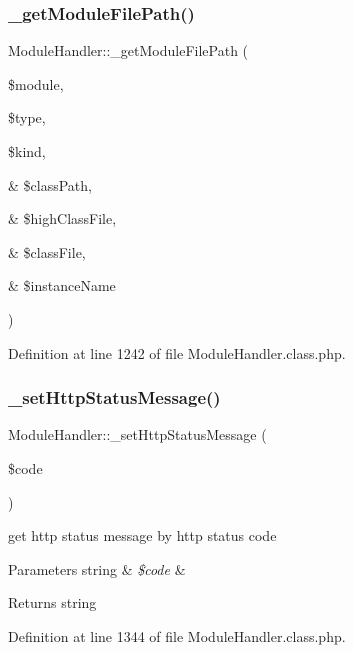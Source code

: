 \subsubsection{\texorpdfstring{\+\_\+get\+Module\+File\+Path()}{\_getModuleFilePath()}}
{\footnotesize\ttfamily Module\+Handler\+::\+\_\+get\+Module\+File\+Path (\begin{DoxyParamCaption}\item[{}]{\$module,  }\item[{}]{\$type,  }\item[{}]{\$kind,  }\item[{\&}]{\$class\+Path,  }\item[{\&}]{\$high\+Class\+File,  }\item[{\&}]{\$class\+File,  }\item[{\&}]{\$instance\+Name }\end{DoxyParamCaption})}



Definition at line 1242 of file Module\+Handler.\+class.\+php.

\mbox{\label{classModuleHandler_a91c14051caea99153975f2335a2dc770}} 
\subsubsection{\texorpdfstring{\+\_\+set\+Http\+Status\+Message()}{\_setHttpStatusMessage()}}
{\footnotesize\ttfamily Module\+Handler\+::\+\_\+set\+Http\+Status\+Message (\begin{DoxyParamCaption}\item[{}]{\$code }\end{DoxyParamCaption})}

get http status message by http status code 
\begin{DoxyParams}[1]{Parameters}
string & {\em \$code} & \\
\hline
\end{DoxyParams}
\begin{DoxyReturn}{Returns}
string 
\end{DoxyReturn}


Definition at line 1344 of file Module\+Handler.\+class.\+php.

\mbox{\label{classModuleHandler_aa47d0ccb069d65698ade6f44bf6c705f}} 
